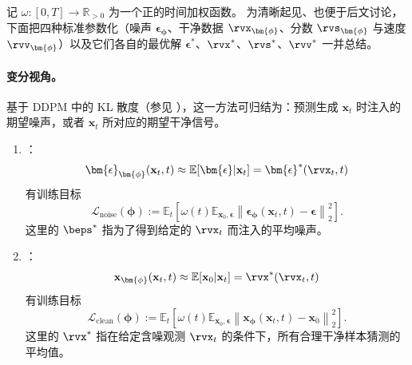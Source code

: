 记 $\omega: [0, T] \to \mathbb{R}_{>0}$ 为一个正的时间加权函数。
为清晰起见、也便于后文讨论，下面把四种标准参数化（噪声 $\bm{\epsilon}_{\bm{\phi}}$、干净数据 $\rvx_{\bm{\phi}}$、分数 $\rvs_{\bm{\phi}}$ 与速度 $\rvv_{\bm{\phi}}$）以及它们各自的最优解 $\bm{\epsilon}^*$、$\rvx^*$、$\rvs^*$、$\rvv^*$ 一并总结。

\paragraph{变分视角。} 基于 DDPM 中的 KL 散度（参见 ），这一方法可归结为：预测生成 $\mathbf{x}_t$ 时注入的期望噪声，或者 $\mathbf{x}_t$ 所对应的期望干净信号。
\begin{enumerate}
    \item {} \citep{ho2020denoising}：
    \begin{equation}\label{eq:noise-def}
        \bm{\epsilon}_{\bm{\phi}}(\mathbf{x}_t,t) \approx \mathbb{E}[\bm{\epsilon}|\mathbf{x}_t]=\bm{\epsilon}^*(\rvx_t, t)
    \end{equation}
    有训练目标
    \[
        \mathcal{L}_{\text{noise}}(\bm{\phi}) := \mathbb{E}_t \left[\omega(t) \mathbb{E}_{\mathbf{x}_0, \bm{\epsilon}} \left\| \bm{\epsilon}_{\bm{\phi}}(\mathbf{x}_t,t) - \bm{\epsilon} \right\|_2^2 \right].
    \]
    这里的 $\beps^*$ 指为了得到给定的 $\rvx_t$ 而注入的平均噪声。

    \item {} \citep{kingma2021variational,karras2022elucidating,song2023consistency}：
    \begin{equation}\label{eq:clean-def}
        \mathbf{x}_{\bm{\phi}}(\mathbf{x}_t,t) \approx \mathbb{E}[\mathbf{x}_0|\mathbf{x}_t]=\rvx^*(\rvx_t, t)
    \end{equation}
    有训练目标
    \[
        \mathcal{L}_{\text{clean}}(\bm{\phi}) := \mathbb{E}_t \left[\omega(t) \mathbb{E}_{\mathbf{x}_0, \bm{\epsilon}} \left\| \mathbf{x}_{\bm{\phi}}(\mathbf{x}_t,t) - \mathbf{x}_0 \right\|_2^2 \right].
    \]
    这里的 $\rvx^*$ 指在给定含噪观测 $\rvx_t$ 的条件下，所有合理干净样本猜测的平均值。
\end{enumerate}

